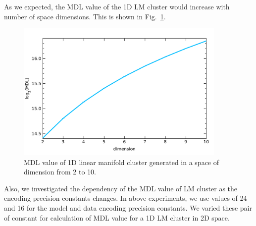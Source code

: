 As we expected, the MDL value of the 1D LM cluster would increase with number of
space dimensions. This is shown in Fig.~\ref{fig:mdl-exp2}.
\bigskip

\begin{figure}[ht]
\center
\includegraphics[width=4in]{img/results_mdl-exp2_1.pdf}
\caption{MDL value of 1D linear manifold cluster generated in a space of dimension from 2 to 10.}
\label{fig:mdl-exp2}
\end{figure}



Also, we investigated the dependency of the MDL value of LM cluster as
the encoding precision constants changes. In above experiments, we use values of
24 and 16 for the model and data encoding precision constants. We varied these
pair of constant for calculation of MDL value for a 1D LM cluster in 2D space.



